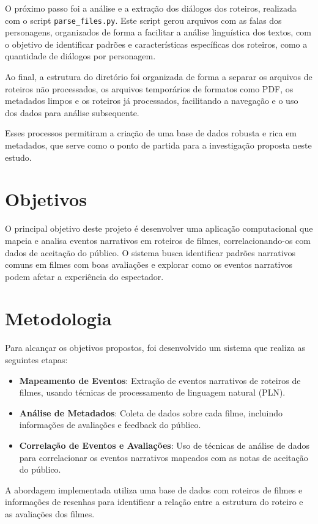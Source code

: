 \documentclass[conference]{IEEEtran}
\begin{document}
O próximo passo foi a análise e a extração dos diálogos dos roteiros, realizada com o script \texttt{parse\_files.py}. Este script gerou arquivos com as falas dos personagens, organizados de forma a facilitar a análise linguística dos textos, com o objetivo de identificar padrões e características específicas dos roteiros, como a quantidade de diálogos por personagem.

Ao final, a estrutura do diretório foi organizada de forma a separar os arquivos de roteiros não processados, os arquivos temporários de formatos como PDF, os metadados limpos e os roteiros já processados, facilitando a navegação e o uso dos dados para análise subsequente.

Esses processos permitiram a criação de uma base de dados robusta e rica em metadados, que serve como o ponto de partida para a investigação proposta neste estudo.

\section{Objetivos}
O principal objetivo deste projeto é desenvolver uma aplicação computacional que mapeia e analisa eventos narrativos em roteiros de filmes, correlacionando-os com dados de aceitação do público. O sistema busca identificar padrões narrativos comuns em filmes com boas avaliações e explorar como os eventos narrativos podem afetar a experiência do espectador.

\section{Metodologia}
Para alcançar os objetivos propostos, foi desenvolvido um sistema que realiza as seguintes etapas:

\begin{itemize}
    \item \textbf{Mapeamento de Eventos}: Extração de eventos narrativos de roteiros de filmes, usando técnicas de processamento de linguagem natural (PLN).
    \item \textbf{Análise de Metadados}: Coleta de dados sobre cada filme, incluindo informações de avaliações e feedback do público.
    \item \textbf{Correlação de Eventos e Avaliações}: Uso de técnicas de análise de dados para correlacionar os eventos narrativos mapeados com as notas de aceitação do público.
\end{itemize}

A abordagem implementada utiliza uma base de dados com roteiros de filmes e informações de resenhas para identificar a relação entre a estrutura do roteiro e as avaliações dos filmes.
\end{document}
